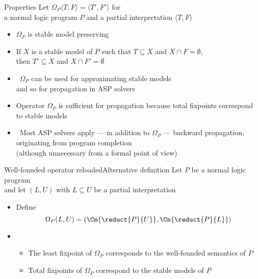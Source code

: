 \begin{frame}{Properties}
  Let $\Omega_P\langle T,F \rangle=\langle T',F'\rangle$
  for\\
  a normal logic program $P$ and
  a partial interpretation $\langle T,F \rangle$
  \smallskip
  \begin{itemize}
  \item<2-> $\Omega_P$ is \alert{stable model preserving}
  \item<2-> [] If $X$ is a stable model of $P$ such that $T\subseteq X$ and $X\cap F=\emptyset$,
    \\ then $T'\subseteq X$ and $X\cap F'=\emptyset$
    \smallskip
  \item<3->  \ $\Omega_P$ can be used for approximating stable models
    \\ and so for propagation in ASP solvers
    \smallskip
  \item <4-> [] %
    Operator $\Omega_P$ is sufficient for propagation
    because total fixpoints correspond to stable models
    \medskip
  \item<5->  \
    Most ASP solvers apply --- in addition to $\Omega_P$ --- \alert{backward propagation},
    originating from program completion
    \\
    (although unnecessary from a formal point of view)
  \end{itemize}
\end{frame}
\begin{frame}{Well-founded operator reloaded}{Alternative definition}
  Let $P$ be a normal logic program\\
  and let $(L,U)$ with $L\subseteq U$ be a partial interpretation
  \bigskip
  \begin{itemize}
  \item <2-> Define
    \[
      \Omega_P(L,U)
      =
      (\Cn{\reduct{P}{U}},\Cn{\reduct{P}{L}})
    \]
  \item <3-> 
    \begin{itemize}\normalsize
    \item The least fixpoint  of $\Omega_P$ corresponds to the well-founded semantics of $P$
      \smallskip
    \item Total fixpoints of $\Omega_P$ correspond  to the stable models of $P$
    \end{itemize}
  \end{itemize}
  \nocite{truszczynski18a}
\end{frame}
%
